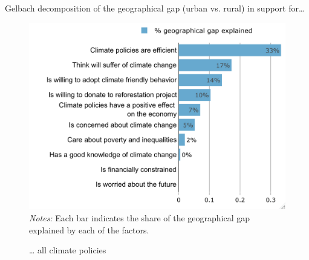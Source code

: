 \begin{frame}{Gelbach decomposition of the geographical gap (urban vs. rural) in support for…}%
\vspace{-.2cm}
\begin{figure}[h!]
\caption{… all climate policies}
\includegraphics[width=.65\textwidth]{../../figures/Gelbach/gelbach_urban_all_policies_D2SD_small} \\
{\tiny \textit{Notes:} Each bar indicates the share of the geographical gap explained by each of the factors.}
\end{figure}
\end{frame}


